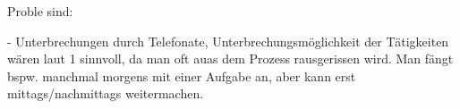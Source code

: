 Proble sind:

- Unterbrechungen durch Telefonate, Unterbrechungsmöglichkeit der Tätigkeiten wären laut 1 sinnvoll, da man oft auas dem Prozess rausgerissen wird. Man fängt bspw. manchmal morgens mit einer Aufgabe an, aber kann erst mittags/nachmittags weitermachen.